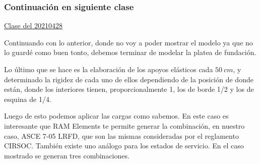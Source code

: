 \documentclass[../main.tex]{subfiles}
\begin{document}
\subsubsection{Continuación en siguiente clase}

\href{https://youtu.be/29KwPvQSee4}{Clase del 20210428}

Continuando con lo anterior, donde no voy a poder mostrar el modelo ya que no 
lo guardé como buen tonto, debemos terminar de modelar la platea de fundación.

Lo último que se hace es la elaboración de los apoyos elásticos cada $\SI{50}{cm}$,
y determinado la rigidez de cada uno de ellos dependiendo de la posición de donde
están, donde los interiores tienen, proporcionalmente 1, los de borde 1/2 y los
de esquina de 1/4.

Luego de esto podemos aplicar las cargas como sabemos. En este caso es interesante
que RAM Elements te permite generar la combinación, en nuestro caso, ASCE 7-05 LRFD,
que son las mismas consideradas por el reglamento CIRSOC. También existe uno 
análogo para los estados de servicio. En el caso mostrado se generan tres
combinaciones.
\end{document}
